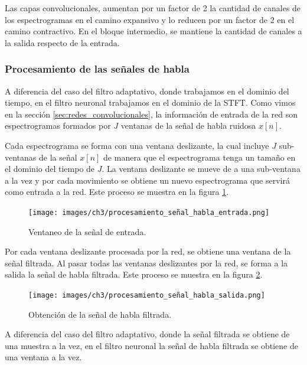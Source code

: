 Las capas convolucionales, aumentan por un factor de 2 la cantidad de canales de los espectrogramas en el camino expansivo y lo reducen por un factor de 2 en el camino contractivo. En el bloque intermedio, se mantiene la cantidad de canales a la salida respecto de la entrada.

\subsubsection{Procesamiento de las señales de habla}
\label{sec:filtro_neuronal_procesamiento_de_señales}

A diferencia del caso del filtro adaptativo, donde trabajamos en el dominio del tiempo, en el filtro neuronal trabajamos en el dominio de la STFT. Como vimos en la sección \ref{sec:redes_convolucionales}, la información de entrada de la red son espectrogramas formados por $J$ ventanas de la señal de habla ruidosa $x[n]$.

Cada espectrograma se forma con una ventana deslizante, la cual incluye $J$ sub-ventanas de la señal $x[n]$ de manera que el espectrograma tenga un tamaño en el dominio del tiempo de $J$. La ventana deslizante se mueve de a una sub-ventana a la vez y por cada movimiento se obtiene un nuevo espectrograma que servirá como entrada a la red. Este proceso se muestra en la figura \ref{fig:ch3_procesamiento_señal_habla_entrada}.

\begin{figure}
	\centering
	\centerline{\texttt{[image: images/ch3/procesamiento\_señal\_habla\_entrada.png]}}
	\caption{Ventaneo de la señal de entrada.}
	\label{fig:ch3_procesamiento_señal_habla_entrada}
\end{figure}

Por cada ventana deslizante procesada por la red, se obtiene una ventana de la señal filtrada. Al pasar todas las ventanas deslizantes por la red, se forma a la salida la señal de habla filtrada. Este proceso se muestra en la figura \ref{fig:ch3_procesamiento_señal_habla_salida}.

\begin{figure}[H]
	\centering
	\centerline{\texttt{[image: images/ch3/procesamiento\_señal\_habla\_salida.png]}}
	\caption{Obtención de la señal de habla filtrada.}
	\label{fig:ch3_procesamiento_señal_habla_salida}
\end{figure}

A diferencia del caso del filtro adaptativo, donde la señal filtrada se obtiene de una muestra a la vez, en el filtro neuronal la señal de habla filtrada se obtiene de una ventana a la vez.